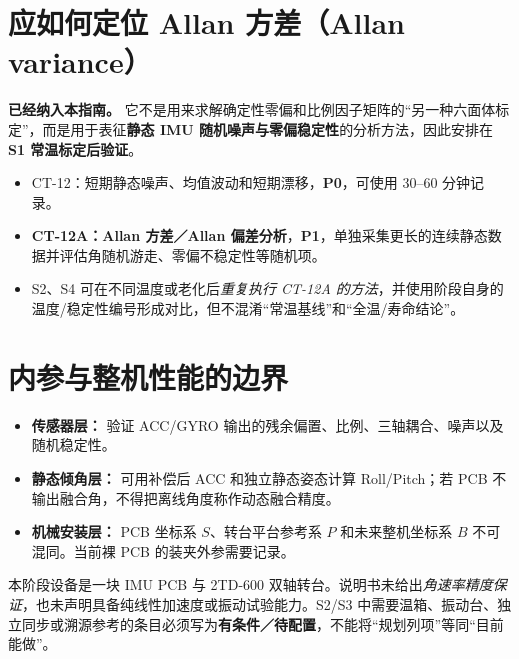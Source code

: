 \section{应如何定位 Allan 方差（Allan variance）}
\textbf{已经纳入本指南。} 它不是用来求解确定性零偏和比例因子矩阵的“另一种六面体标定”，而是用于表征\textbf{静态 IMU 随机噪声与零偏稳定性}的分析方法，因此安排在 \textbf{S1 常温标定后验证}。
\begin{itemize}
\item CT-12：短期静态噪声、均值波动和短期漂移，\textbf{P0}，可使用 30--60 分钟记录。
\item \textbf{CT-12A：Allan 方差／Allan 偏差分析}，\textbf{P1}，单独采集更长的连续静态数据并评估角随机游走、零偏不稳定性等随机项。
\item S2、S4 可在不同温度或老化后\emph{重复执行 CT-12A 的方法}，并使用阶段自身的温度/稳定性编号形成对比，但不混淆“常温基线”和“全温/寿命结论”。
\end{itemize}
\section{内参与整机性能的边界}
\begin{itemize}
\item \textbf{传感器层：} 验证 ACC/GYRO 输出的残余偏置、比例、三轴耦合、噪声以及随机稳定性。
\item \textbf{静态倾角层：} 可用补偿后 ACC 和独立静态姿态计算 Roll/Pitch；若 PCB 不输出融合角，不得把离线角度称作动态融合精度。
\item \textbf{机械安装层：} PCB 坐标系 $S$、转台平台参考系 $P$ 和未来整机坐标系 $B$ 不可混同。当前裸 PCB 的装夹外参需要记录。
\end{itemize}
\begin{warningbox}
本阶段设备是一块 IMU PCB 与 2TD-600 双轴转台。说明书未给出\emph{角速率精度保证}，也未声明具备纯线性加速度或振动试验能力。S2/S3 中需要温箱、振动台、独立同步或溯源参考的条目必须写为\textbf{有条件／待配置}，不能将“规划列项”等同“目前能做”。
\end{warningbox}
